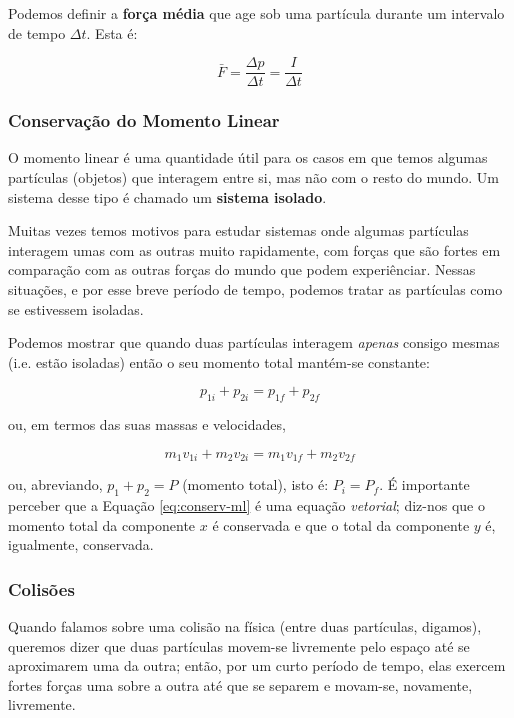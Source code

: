 Podemos definir a \textbf{força média} que age sob uma partícula durante um intervalo de tempo $\Delta t$. Esta é:

$$
\bar{F}=\frac{\Delta p}{\Delta t}=\frac{I}{\Delta t}
$$

\subsubsection{Conservação do Momento Linear}
O momento linear é uma quantidade útil para os casos em que temos algumas partículas (objetos) que interagem entre si, mas não com o resto do mundo. Um sistema desse tipo é chamado um \textbf{sistema isolado}.

Muitas vezes temos motivos para estudar sistemas onde algumas partículas interagem umas com as outras muito rapidamente, com forças que são fortes em comparação com as outras forças do mundo que podem experiênciar. Nessas situações, e por esse breve período de tempo, podemos tratar as partículas como se estivessem isoladas.

Podemos mostrar que quando duas partículas interagem \emph{apenas} consigo mesmas (i.e. estão isoladas) então o seu momento total mantém-se constante:

\begin{equation}\label{eq:conserv-ml}
    p_{1i}+p_{2i}=p_{1f}+p_{2f}
\end{equation}

ou, em termos das suas massas e velocidades,

\begin{equation}
    m_1v_{1i}+m_2v_{2i}=m_1v_{1f}+m_2v_{2f}
\end{equation}

ou, abreviando, $p_1+p_2=P$ (momento total), isto é: $P_i=P_f$.
É importante perceber que a Equação \ref{eq:conserv-ml} é uma equação \emph{vetorial}; diz-nos que o momento total da componente $x$ é conservada e que o total da componente $y$ é, igualmente, conservada.

\subsubsection{Colisões}
Quando falamos sobre uma colisão na física (entre duas partículas, digamos), queremos dizer que duas partículas movem-se livremente pelo espaço até se aproximarem uma da outra; então, por um
curto período de tempo, elas exercem fortes forças uma sobre a outra até que se separem e movam-se, novamente, livremente.

